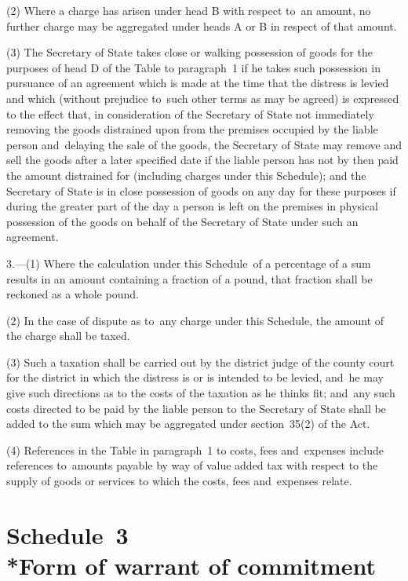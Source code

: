 \documentclass[12pt,a4paper]{article}
\begin{document}
(2) Where a charge has arisen under head B with respect to~an amount, no further charge may be aggregated under heads A or B in respect of that amount.

(3) The Secretary of State takes close or walking possession of goods for the purposes of head D of the Table to paragraph~1 if he takes such possession in pursuance of an agreement which is made at the time that the distress is levied and which (without prejudice to~such other terms as may be agreed) is expressed to the effect that, in consideration of the Secretary of State not immediately removing the goods distrained upon from the premises occupied by the liable person and~delaying the sale of the goods, the Secretary of State may remove and sell the goods after a later specified date if the liable person has not by then paid the amount distrained for (including charges under this Schedule); and the Secretary of State is in close possession of goods on any day for these purposes if during the greater part of the day a person is left on the premises in physical possession of the goods on behalf of the Secretary of State under such an agreement.

\medskip

3.—(1) Where the calculation under this Schedule~of a percentage of a sum results in an amount containing a fraction of a pound, that fraction shall be reckoned as a whole pound.

(2) In the case of dispute as to~any charge under this Schedule, the amount of the charge shall be taxed.

(3) Such a taxation shall be carried out by the district judge of the county court for the district in which the distress is or is intended to be levied, and~he may give such directions as to the costs of the taxation as he thinks fit; and~any such costs directed to be paid by the liable person to the Secretary of State shall be added to the sum which may be aggregated under section~35(2) of the Act.

(4) References in the Table in paragraph~1 to costs, fees and~expenses include references to~amounts payable by way of value added tax with respect to the supply of goods or services to which the costs, fees and~expenses relate.

\part[Schedule~3 --- Form of warrant of commitment]{Schedule~3\\*Form of warrant of commitment}
\end{document}
